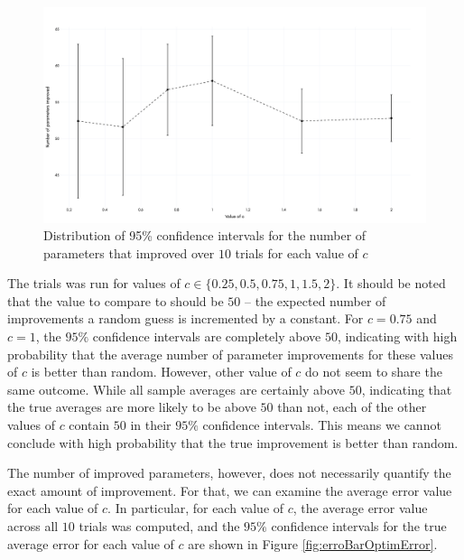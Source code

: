 \documentclass{article}
\theoremstyle{definition}
\begin{document}
\begin{figure}[hbt!]
    \par
    \begin{center}
    \caption{Distribution of 95\% confidence intervals for the number of parameters that improved over $10$ trials for each value of $c$}
    \label{fig:errorBarNumImproved}
    \includegraphics[scale=0.10]{Figures/error_bars_num_params_improved.png}
    \end{center}
    \par
    \vspace{-0.25in}
    \medskip
\end{figure}

\newpage

The trials was run for values of $c \in \{0.25, 0.5, 0.75, 1, 1.5, 2\}$. It should be noted that the value to compare to should be $50$ -- the expected number of improvements a random guess is incremented by a constant. For $c=0.75$ and $c=1$, the $95\%$ confidence intervals are completely above $50$, indicating with high probability that the average number of parameter improvements for these values of $c$ is better than random. However, other value of $c$ do not seem to share the same outcome. While all sample averages are certainly above $50$, indicating that the true averages are more likely to be above $50$ than not, each of the other values of $c$ contain $50$ in their $95\%$ confidence intervals. This means we cannot conclude with high probability that the true improvement is better than random. 

The number of improved parameters, however, does not necessarily quantify the exact amount of improvement. For that, we can examine the average error value for each value of $c$. In particular, for each value of $c$, the average error value across all $10$ trials was computed, and the $95\%$ confidence intervals for the true average error for each value of $c$ are shown in Figure \ref{fig:erroBarOptimError}.
\end{document}
